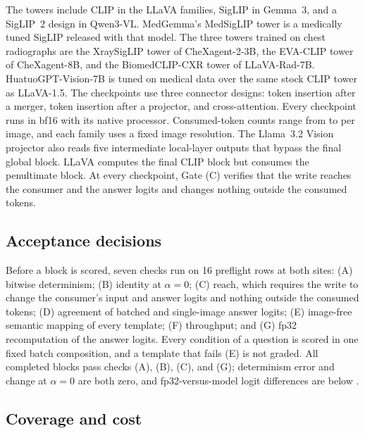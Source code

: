 The towers include CLIP\cite{radford2021clip} in the LLaVA families, SigLIP\cite{zhai2023siglip} in Gemma~3, and a SigLIP~2 design\cite{tschannen2025siglip2} in Qwen3-VL. MedGemma's MedSigLIP tower is a medically tuned SigLIP released with that model\cite{sellergren2025medgemma}. The three towers trained on chest radiographs are the XraySigLIP tower of CheXagent-2-3B\cite{chen2024chexagent}, the EVA-CLIP tower\cite{sun2023evaclip} of CheXagent-8B, and the BiomedCLIP-CXR tower of LLaVA-Rad-7B\cite{zhang2025biomedclip,zambranochaves2025llavarad}. HuatuoGPT-Vision-7B is tuned on medical data over the same stock CLIP tower as LLaVA-1.5. The checkpoints use three connector designs: token insertion after a merger, token insertion after a projector, and cross-attention. Every checkpoint runs in bf16 with its native processor. Consumed-token counts range from \cfTokensMin{} to \cfTokensMax{} per image, and each family uses a fixed image resolution. The Llama~3.2 Vision projector also reads five intermediate local-layer outputs that bypass the final global block. LLaVA computes the final CLIP block but consumes the penultimate block. At every checkpoint, Gate (C) verifies that the write reaches the consumer and the answer logits and changes nothing outside the consumed tokens.

\subsection{Acceptance decisions}
\label{app:cf-gates}

Before a block is scored, seven checks run on 16 preflight rows at both sites: (A) bitwise determinism; (B) identity at $\alpha=0$; (C) reach, which requires the write to change the consumer's input and answer logits and nothing outside the consumed tokens; (D) agreement of batched and single-image answer logits; (E) image-free semantic mapping of every template; (F) throughput; and (G) fp32 recomputation of the answer logits. Every condition of a question is scored in one fixed batch composition, and a template that fails (E) is not graded. All \cfWriteBlocks{} completed blocks pass checks (A), (B), (C), and (G); determinism error and change at $\alpha=0$ are both zero, and fp32-versus-model logit differences are below \cfGateFpMax{}.

\subsection{Coverage and cost}
\label{app:cf-coverage}

